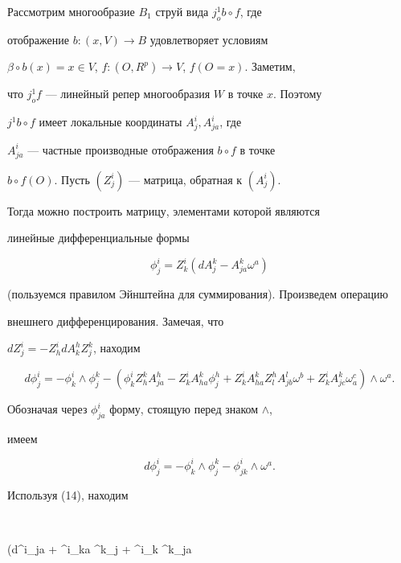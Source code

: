 Рассмотрим многообразие $B_1$ струй вида $j^1_o b \circ f$, где


отображение $b: (x,V) \to B$ удовлетворяет условиям


$\beta \circ b(x) = x \in V$, $f: (O,R^p) \to V$, $f(O = x)$. Заметим,


что $j^1_o f$ --- линейный репер многообразия $W$ в точке $x$. Поэтому


$j^1 b \circ f$ имеет локальные координаты $A^i_j, A^i_{ja}$, где


$A^i_{ja}$ --- частные производные отображения $b \circ f$ в точке


$b \circ f(O)$. Пусть $(Z^i_j)$ --- матрица, обратная к $(A^i_j)$.


Тогда можно построить матрицу, элементами которой являются


линейные дифференциальные формы


\begin{equation}


\phi^i_j = Z^i_k (dA^k_j - A^k_{ja} \omega^a)


\end{equation}


(пользуемся правилом Эйнштейна для суммирования). Произведем операцию


внешнего дифференцирования. Замечая, что


$dZ^i_j = - Z^i_h dA^h_k Z^k_j$, находим


$$


d\phi^i_j = - \phi^i_k \wedge \phi^k_j -


(\phi^i_k Z^k_h A^h_{ja} - Z^i_k A^k_{ha} \phi^h_j +


Z^i_k A^k_{ha} Z^h_l A^l_{jb} \omega^b + Z^i_k A^k_{jc} \omega^c_a)


\wedge \omega^a.


$$


Обозначая через $\phi^i_{ja}$ форму, стоящую перед знаком $\wedge$,


имеем


\begin{equation}


d\phi^i_j = - \phi^i_k \wedge \phi^k_j - \phi^i_{jk} \wedge \omega^a.


\end{equation}


Используя (14), находим


$$


(d\phi^i_{ja} + \phi^i_{ka} \wedge \phi^k_j + \phi^i_k \wedge \phi^k_{ja}


